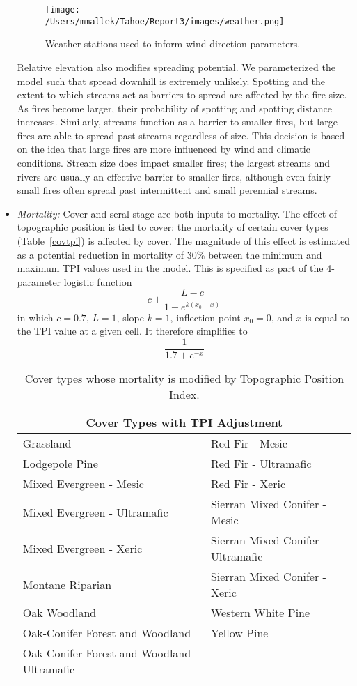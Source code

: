 \begin{itemize}
\begin{figure}[htbp]
\centering
\texttt{[image: /Users/mmallek/Tahoe/Report3/images/weather.png]}
\caption{Weather stations used to inform wind direction parameters.}
\label{weather}
\end{figure}

Relative elevation also modifies spreading potential. We parameterized the model such that spread downhill is extremely unlikely. Spotting and the extent to which streams act as barriers to spread are affected by the fire size. As fires become larger, their probability of spotting and spotting distance increases. Similarly, streams function as a barrier to smaller fires, but large fires are able to spread past streams regardless of size. This decision is based on the idea that large fires are more influenced by wind and climatic conditions. Stream size does impact smaller fires; the largest streams and rivers are usually an effective barrier to smaller fires, although even fairly small fires often spread past intermittent and small perennial streams. 


\item \emph{Mortality:} Cover and seral stage are both inputs to mortality. The effect of topographic position is tied to cover: the mortality of certain cover types (Table~\ref{covtpi}) is affected by cover. The magnitude of this effect is estimated as a potential reduction in mortality of 30\% between the minimum and maximum TPI values used in the model. This is specified as part of the 4-parameter logistic function 
$$c + \frac{L-c}{1+e^{k(x_0-x)}}$$
in which $c= 0.7$, $L=1$, slope $k=1$, inflection point $x_0=0$, and $x$ is equal to the TPI value at a given cell. It therefore simplifies to 
$$\frac{1}{1.7+e^{-x}}$$

\begin{table}[htbp]
\small
\centering
\caption{Cover types whose mortality is modified by Topographic Position Index.}
\begin{tabular}{ll}
\hline
\multicolumn{2}{c}{\textbf{Cover Types with TPI Adjustment}} \\
\hline
Grassland     									& Red Fir - Mesic   					\\
Lodgepole Pine    								& Red Fir - Ultramafic					\\
Mixed Evergreen - Mesic							& Red Fir - Xeric    					\\
Mixed Evergreen - Ultramafic     				& Sierran Mixed Conifer - Mesic    		\\
Mixed Evergreen - Xeric 						& Sierran Mixed Conifer - Ultramafic 	\\
Montane Riparian								& Sierran Mixed Conifer - Xeric 		\\
Oak Woodland 									& Western White Pine					\\
Oak-Conifer Forest and Woodland 				& Yellow Pine 							\\
Oak-Conifer Forest and Woodland - Ultramafic 	&										\\
\hline
\end{tabular}
\end{table}


\end{itemize}
